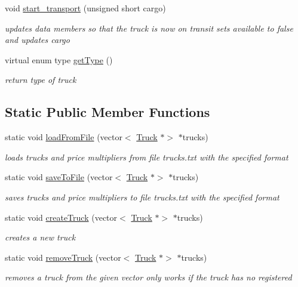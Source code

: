\begin{DoxyCompactItemize}
void \hyperlink{class_truck_aca68ecb83bcdc73de6bd381dccb70e4d}{start\+\_\+transport} (unsigned short cargo)
\begin{DoxyCompactList}\small\item\em updates data members so that the truck is now on transit sets available to false and updates cargo \end{DoxyCompactList}\item 
virtual enum type \hyperlink{class_truck_a24406caf4d09be7f3eff069ce6bc015b}{get\+Type} ()
\begin{DoxyCompactList}\small\item\em return type of truck \end{DoxyCompactList}\end{DoxyCompactItemize}
\subsection*{Static Public Member Functions}
\begin{DoxyCompactItemize}
\item 
static void \hyperlink{class_truck_ae2d129e4cdd6760feee9a81421d40e17}{load\+From\+File} (vector$<$ \hyperlink{class_truck}{Truck} $\ast$$>$ $\ast$trucks)
\begin{DoxyCompactList}\small\item\em loads trucks and price multipliers from file trucks.\+txt with the specified format \end{DoxyCompactList}\item 
static void \hyperlink{class_truck_ad03e7d588f7f6dc24e1423e2e481ad3a}{save\+To\+File} (vector$<$ \hyperlink{class_truck}{Truck} $\ast$$>$ $\ast$trucks)
\begin{DoxyCompactList}\small\item\em saves trucks and price multipliers to file trucks.\+txt with the specified format \end{DoxyCompactList}\item 
static void \hyperlink{class_truck_a4b2a202b4fe0bf70249493a9aa30f5dd}{create\+Truck} (vector$<$ \hyperlink{class_truck}{Truck} $\ast$$>$ $\ast$trucks)
\begin{DoxyCompactList}\small\item\em creates a new truck \end{DoxyCompactList}\item 
static void \hyperlink{class_truck_acb3e375dfa4ba812de7e65f0b3e37ded}{remove\+Truck} (vector$<$ \hyperlink{class_truck}{Truck} $\ast$$>$ $\ast$trucks)
\begin{DoxyCompactList}\small\item\em removes a truck from the given vector only works if the truck has no registered \end{DoxyCompactList}\end{DoxyCompactItemize}
